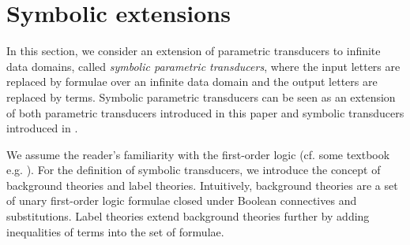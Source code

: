 
\section{Symbolic extensions}
\label{sec:symbolic}


In this section, we consider an extension of parametric transducers to infinite data domains, called \emph{symbolic parametric transducers}, where the input letters are replaced by formulae over an infinite data domain and the output letters are replaced by terms. 
%
Symbolic parametric transducers can be seen as an extension of both parametric transducers introduced in this paper and symbolic transducers introduced in \cite{VHLMB12}.

We assume the reader's familiarity with the first-order logic (cf. some textbook e.g. \cite{EFT94}).
For the definition of symbolic transducers, we introduce the concept of background theories and label theories. Intuitively, background theories are a set of unary first-order logic formulae closed under Boolean connectives and substitutions. Label theories extend background theories further by adding inequalities of terms into the set of formulae.

